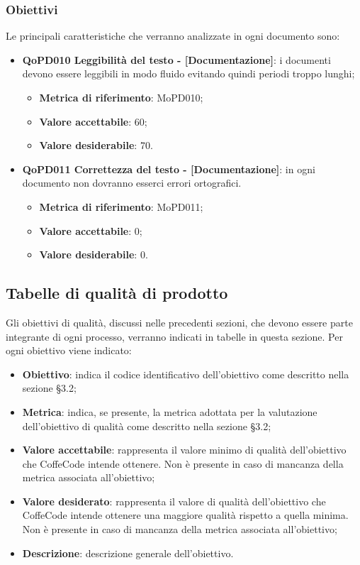 \documentclass[../piano-di-qualifica.tex]{subfiles}
\begin{document}
\subsubsection{Obiettivi}
\label{sub:obiettivi}
Le principali caratteristiche che verranno analizzate in ogni documento sono:
\begin{itemize}
    \item \textbf{QoPD010 Leggibilità del testo - [Documentazione]}: i documenti devono essere leggibili in modo fluido evitando quindi periodi troppo lunghi;
        \begin{itemize}
            \item \textbf{Metrica di riferimento}: MoPD010;
            \item \textbf{Valore accettabile}: 60;
            \item \textbf{Valore desiderabile}: 70.
        \end{itemize}
    \item \textbf{QoPD011 Correttezza del testo - [Documentazione]}: in ogni documento non dovranno esserci errori ortografici.
        \begin{itemize}
            \item \textbf{Metrica di riferimento}: MoPD011;
            \item \textbf{Valore accettabile}: 0;
            \item \textbf{Valore desiderabile}: 0.
        \end{itemize}
\end{itemize}

\subsection{Tabelle di qualità di prodotto}
\label{sub:tabelle_di_qualita_di_prodotto}
Gli obiettivi di qualità, discussi nelle precedenti sezioni, che devono essere parte integrante di ogni processo, verranno indicati in tabelle in questa sezione.
Per ogni obiettivo viene indicato:

\begin{itemize}
   \item \textbf{Obiettivo}: indica il codice identificativo dell'obiettivo come descritto nella sezione §3.2;
   \item \textbf{Metrica}: indica, se presente, la metrica adottata per la valutazione dell'obiettivo di qualità come descritto nella sezione §3.2;
   \item \textbf{Valore accettabile}: rappresenta il valore minimo di qualità dell'obiettivo che CoffeCode intende ottenere. Non è presente in caso di mancanza della metrica associata all'obiettivo;
   \item \textbf{Valore desiderato}: rappresenta il valore di qualità dell'obiettivo che CoffeCode intende ottenere una maggiore qualità rispetto a quella minima. Non è presente in caso di mancanza della metrica associata all'obiettivo;
   \item \textbf{Descrizione}: descrizione generale dell'obiettivo.
\end{itemize}
\end{document}
